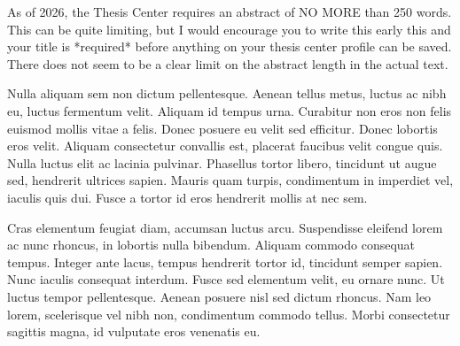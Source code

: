 As of 2026, the Thesis Center requires an abstract of NO MORE than 250 words. This can be quite limiting, but I would encourage you to write this early this and your title is *required* before anything on your thesis center profile can be saved. There does not seem to be a clear limit on the abstract length in the actual text.

Nulla aliquam sem non dictum pellentesque. Aenean tellus metus, luctus ac nibh eu, luctus fermentum velit. Aliquam id tempus urna. Curabitur non eros non felis euismod mollis vitae a felis. Donec posuere eu velit sed efficitur. Donec lobortis eros velit. Aliquam consectetur convallis est, placerat faucibus velit congue quis. Nulla luctus elit ac lacinia pulvinar. Phasellus tortor libero, tincidunt ut augue sed, hendrerit ultrices sapien. Mauris quam turpis, condimentum in imperdiet vel, iaculis quis dui. Fusce a tortor id eros hendrerit mollis at nec sem.

Cras elementum feugiat diam, accumsan luctus arcu. Suspendisse eleifend lorem ac nunc rhoncus, in lobortis nulla bibendum. Aliquam commodo consequat tempus. Integer ante lacus, tempus hendrerit tortor id, tincidunt semper sapien. Nunc iaculis consequat interdum. Fusce sed elementum velit, eu ornare nunc. Ut luctus tempor pellentesque. Aenean posuere nisl sed dictum rhoncus. Nam leo lorem, scelerisque vel nibh non, condimentum commodo tellus. Morbi consectetur sagittis magna, id vulputate eros venenatis eu. 



